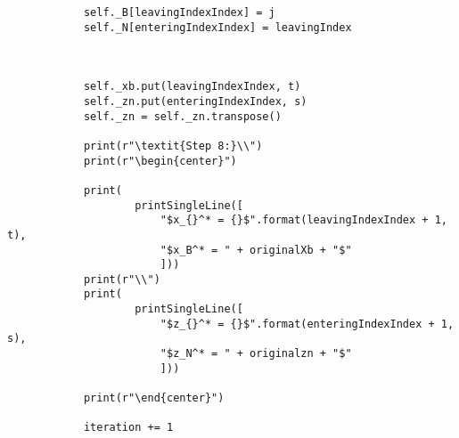 \documentclass{article}
\begin{document}
\begin{lstlisting}
            self._B[leavingIndexIndex] = j
            self._N[enteringIndexIndex] = leavingIndex



            self._xb.put(leavingIndexIndex, t)
            self._zn.put(enteringIndexIndex, s)
            self._zn = self._zn.transpose()

            print(r"\textit{Step 8:}\\")
            print(r"\begin{center}")

            print(
                    printSingleLine([
                        "$x_{}^* = {}$".format(leavingIndexIndex + 1, t),
                        "$x_B^* = " + originalXb + "$"
                        ]))
            print(r"\\")
            print(
                    printSingleLine([
                        "$z_{}^* = {}$".format(enteringIndexIndex + 1, s),
                        "$z_N^* = " + originalzn + "$"
                        ]))

            print(r"\end{center}")

            iteration += 1

\end{lstlisting}
\end{document}
